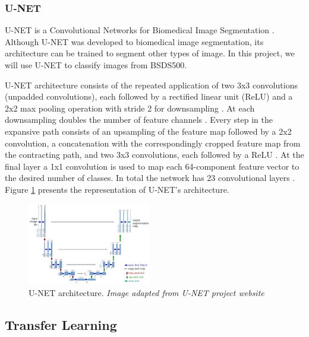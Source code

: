 \documentclass[10pt,twocolumn,letterpaper]{article}
\begin{document}
\subsubsection{U-NET} \label{sssec:unet}

U-NET is a Convolutional Networks for Biomedical Image Segmentation \cite{UNET} \cite{UNET_WEBSITE}. Although U-NET was developed to biomedical image segmentation, its architecture can be trained to segment other types of image. In this project, we will use U-NET to classify images from BSDS500.

U-NET architecture consists of the repeated application of two 3x3 convolutions (unpadded convolutions), each followed by a rectified linear unit (ReLU) and a 2x2 max pooling operation with stride 2 for downsampling \cite{UNET}. At each downsampling doubles the number of feature channels \cite{UNET}. Every step in the expansive path consists of an upsampling of the feature map followed by a 2x2 convolution, a concatenation with the correspondingly cropped feature map from the contracting path, and two 3x3 convolutions, each followed by a ReLU \cite{UNET}. At the final layer a 1x1 convolution is used to map each 64-component feature vector to the desired number of classes. In total the network has 23 convolutional layers \cite{UNET}. Figure \ref{fig:unet} presents the representation of U-NET's architecture.

\begin{figure}[ht]
  \centering
  \includegraphics[width=0.48\textwidth]{unet.png}
  \caption{U-NET architecture. \textit{Image adapted from U-NET project website} \cite{UNET_WEBSITE} \cite{UNET}}
  \label{fig:unet}
\end{figure}

\subsection{Transfer Learning} \label{ssec:transfer_learning}
\end{document}
